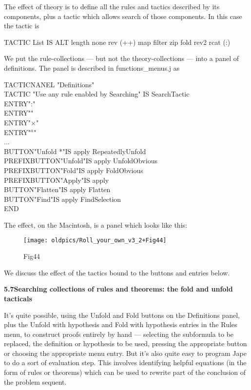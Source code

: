 The effect of theory is to define all the rules and tactics described by its components, plus a tactic which allows search of those components. In this case the tactic is

TACTIC List IS ALT length none rev (++) map filter zip fold rev2 rcat (:)


We put the rule-collections --- but not the theory-collections --- into a panel of definitions. The panel is described in functions\_menus.j as

TACTICNANEL "Definitions" \\
\tab TACTIC "Use any rule enabled by Searching" IS SearchTactic\\
\tab ENTRY\tab ":"\\
\tab ENTRY\tab "{\textbullet}"\tab  \\
\tab ENTRY\tab "$\times$"\tab  \\
\tab ENTRY\tab "\ensuremath{^a}"\tab  \\
\tab ...\\
\tab BUTTON\tab "Unfold *"\tab IS apply RepeatedlyUnfold\\
\tab PREFIXBUTTON\tab "Unfold"\tab IS apply UnfoldObvious\\
\tab PREFIXBUTTON\tab "Fold"\tab IS apply FoldObvious\\
\tab PREFIXBUTTON\tab "Apply"\tab IS apply\\
\tab BUTTON\tab "Flatten"\tab IS apply Flatten\\
\tab BUTTON\tab "Find"\tab IS apply FindSelection\\
END


The effect, on the Macintosh, is a panel which looks like this:

\begin{figure}[htbp] \begin{center} \texttt{[image: oldpics/Roll\_your\_own\_v3\_2+Fig44]} \caption{Fig44} \end{center} \end{figure}


We discuss the effect of the tactics bound to the buttons and entries below.


\textbf{5.7\tab Searching collections of rules and theorems: the fold and unfold tacticals}


It's quite possible, using the Unfold and Fold buttons on the Definitions panel, plus the Unfold with hypothesis and Fold with hypothesis entries in the Rules menu, to construct proofs entirely by hand --- selecting the subformula to be replaced, the definition or hypothesis to be used, pressing the appropriate button or choosing the appropriate menu entry. But it's also quite easy to program Jape to do a sort of evaluation step. This involves identifying helpful equations (in the form of rules or theorems) which can be used to rewrite part of the conclusion of the problem sequent.


